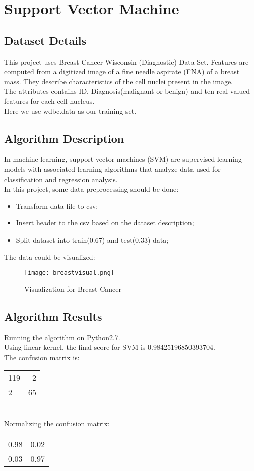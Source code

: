 \documentclass{article}
\begin{document}
\section{Support Vector Machine}
\subsection{Dataset Details}
This project uses Breast Cancer Wisconsin (Diagnostic) Data Set. Features are computed from a digitized image of a fine needle aspirate (FNA) of a breast mass. They describe characteristics of the cell nuclei present in the image.\\
The attributes contains ID, Diagnosis(malignant or benign) and ten real-valued features for each cell nucleus.\\
Here we use wdbc.data as our training set.

\subsection{Algorithm Description}
In machine learning, support-vector machines (SVM) are supervised learning models with associated learning algorithms that analyze data used for classification and regression analysis.\\
In this project, some data preprocessing should be done:
\begin{itemize}
\item Transform data file to csv;
\item Insert header to the csv based on the dataset description;
\item Split dataset into train(0.67) and test(0.33) data;
\end{itemize}
The data could be visualized:
\begin{figure}[H]
\centering
\texttt{[image: breastvisual.png]}
\caption{Visualization for Breast Cancer}
\label{fig5.2.1}
\end{figure}

\subsection{Algorithm Results}
Running the algorithm on Python2.7.\\
Using linear kernel, the final score for SVM is 0.98425196850393704.\\
The confusion matrix is:\\
\begin{tabular}{lr}
119&2\\
2&65
\end{tabular}\\
Normalizing the confusion matrix:\\
\begin{tabular}{lr}
0.98&0.02\\
0.03&0.97
\end{tabular}\\
\end{document}
